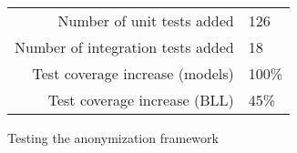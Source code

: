 \begin{figure}[H]
    \centering
    \small
    \begin{tabular}{r l}
        \toprule
        Number of unit tests added          & 126 \\
        Number of integration tests added   & 18 \\
        Test coverage increase (models)     & 100\% \\
        Test coverage increase (BLL)        & 45\% \\
        \bottomrule
    \end{tabular}
    \caption{Testing the anonymization framework}\label{fig:tests_added}
\end{figure}